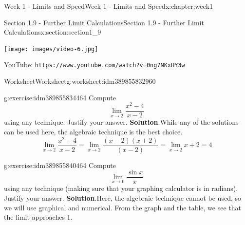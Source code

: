 \documentclass[oneside,10pt,]{book}
\newcommand{\blocktitlefont}{\relax}
\newcommand{\mono}[1]{\texttt{#1}}
\numberwithin{equation}{section}
\newlength{\qrsize}
\newlength{\previewwidth}
\begin{document}
\begin{chapterptx}{Week 1 - Limits and Speed}{}{Week 1 - Limits and Speed}{}{}{x:chapter:week1}
\begin{sectionptx}{Section 1.9 - Further Limit Calculations}{}{Section 1.9 - Further Limit Calculations}{}{}{x:section:section1_9}
\setlength{\qrsize}{9em}
\setlength{\previewwidth}{\linewidth}
\addtolength{\previewwidth}{-\qrsize}
\begin{tcbraster}[raster columns=2, raster column skip=1pt, raster halign=center, raster force size=false, raster left skip=0pt, raster right skip=0pt]%
\begin{tcolorbox}[previewstyle, width=\previewwidth]%
\texttt{[image: images/video-6.jpg]}%
\end{tcolorbox}%
\begin{tcolorbox}[qrstyle]%
{\hypersetup{urlcolor=black}}%
\end{tcolorbox}%
\begin{tcolorbox}[captionstyle]%
\small YouTube: \mono{https://www.youtube.com/watch?v=0ng7NKxHY3w}\end{tcolorbox}%
\end{tcbraster}%
%
%
\typeout{************************************************}
\typeout{************************************************}
%
\begin{worksheet-subsection}{Worksheet}{}{Worksheet}{}{}{g:worksheet:idm389855832960}
\begin{divisionexercise}{1}{}{}{g:exercise:idm389855834464}%
Compute%
\begin{equation*}
\lim_{x\to 2} \frac{x^2-4}{x-2} 
\end{equation*}
using any technique. Justify your answer.%
\textbf{\blocktitlefont Solution}.\hypertarget{g:solution:idm389855835520}{}\quad{}While any of the solutions can be used here, the algebraic technique is the best choice.%
\begin{equation*}
\lim_{x\to 2} \frac{x^2-4}{x-2} = \lim_{x\to 2} \frac{(x-2)(x+2)}{(x-2)} = \lim_{x\to 2} x+2 = 4 
\end{equation*}
%
\end{divisionexercise}%
\begin{divisionexercise}{2}{}{}{g:exercise:idm389855840464}%
Compute%
\begin{equation*}
\lim_{x\to 0} \frac{\sin x}{x} 
\end{equation*}
using any technique (making sure that your graphing calculator is in radians). Justify your answer.%
\textbf{\blocktitlefont Solution}.\hypertarget{g:solution:idm389855842432}{}\quad{}Here, the algebraic technique cannot be used, so we will use graphical and numerical. From the graph and the table, we see that the limit approaches 1.%

\end{divisionexercise}
\end{worksheet-subsection}
\end{sectionptx}
\end{chapterptx}
\end{document}
